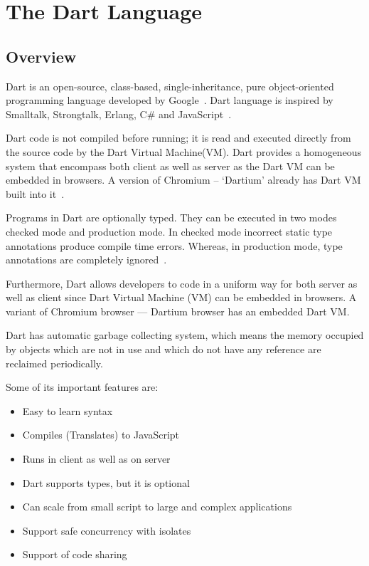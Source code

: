 \section{The Dart Language}
\label{sec:dart}
  \subsection{Overview}
  Dart is an open-source, class-based, single-inheritance, pure object-oriented programming language developed by Google~\cite{dartEcma}. Dart language is inspired by Smalltalk, Strongtalk, Erlang, C\# and JavaScript~\cite{sethladd}.

  Dart code is not compiled before running; it is read and executed directly from the source code by the Dart Virtual Machine(VM). Dart provides a homogeneous system that encompass both client as well as server as the Dart VM can be embedded in browsers. A version of Chromium – ‘Dartium’ already has Dart VM built into it~\cite{sethladd}.

  Programs in Dart are optionally typed. They can be executed in two modes checked mode and production mode. In checked mode incorrect static type annotations produce compile time errors. Whereas, in production mode, type annotations are completely ignored~\cite{dartEcma}.

  Furthermore, Dart allows developers to code in a uniform way for both server as well as client since Dart Virtual Machine (VM) can be embedded in browsers. A variant of Chromium browser — Dartium browser has an embedded Dart VM.

  Dart has automatic garbage collecting system, which means the memory occupied by objects which are not in use and which do not have any reference are reclaimed periodically.

Some of its important features are:
  \begin{itemize}
    \item Easy to learn syntax
    \item Compiles (Translates) to JavaScript
    \item Runs in client as well as on server
    \item Dart supports types, but it is optional
    \item Can scale from small script to large and complex applications
    \item Support safe concurrency with isolates
    \item Support of code sharing
  \end{itemize}

